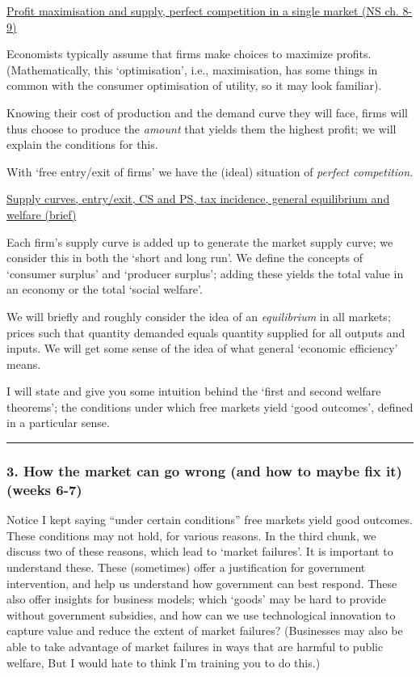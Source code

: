 \documentclass[]{article}
\begin{document}
\underline{Profit maximisation and supply, perfect competition in a single market (NS ch. 8-9)}

Economists typically assume that firms make choices to maximize profits. (Mathematically, this `optimisation', i.e., maximisation, has some things in common with the consumer optimisation of utility, so it may look familiar).

Knowing their cost of production and the demand curve they will face, firms will thus choose to produce the \emph{amount} that yields them the highest profit; we will explain the conditions for this.

With `free entry/exit of firms' we have the (ideal) situation of \emph{perfect competition}.

\underline{Supply curves, entry/exit, CS and PS, tax incidence, general equilibrium and welfare (brief)}

Each firm's supply curve is added up to generate the market supply curve; we consider this in both the `short and long run'.
We define the concepts of `consumer surplus' and `producer surplus'; adding these yields the total value in an economy or the total `social welfare'.

We will briefly and roughly consider the idea of an \emph{equilibrium} in all markets; prices such that quantity demanded equals quantity supplied for all outputs and inputs.
We will get some sense of the idea of what general `economic efficiency' means.

I will state and give you some intuition behind the `first and second welfare theorems'; the conditions under which free markets yield `good outcomes', defined in a particular sense.

\begin{center}\rule{0.5\linewidth}{\linethickness}\end{center}

\hypertarget{how-the-market-can-go-wrong-and-how-to-maybe-fix-it-weeks-6-7}{%
\subsubsection{3. How the market can go wrong (and how to maybe fix it) (weeks 6-7)}\label{how-the-market-can-go-wrong-and-how-to-maybe-fix-it-weeks-6-7}}

Notice I kept saying ``under certain conditions'' free markets yield good outcomes. These conditions may not hold, for various reasons. In the third chunk, we discuss two of these reasons, which lead to `market failures'. It is important to understand these. These (sometimes) offer a justification for government intervention, and help us understand how government can best respond. These also offer insights for business models; which `goods' may be hard to provide without government subsidies, and how can we use technological innovation to capture value and reduce the extent of market failures? (Businesses may also be able to take advantage of market failures in ways that are harmful to public welfare, But I would hate to think I'm training you to do this.)
\end{document}
